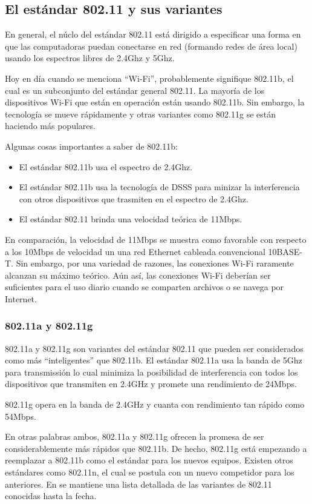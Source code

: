 \documentclass[10pt,journal,compsoc]{IEEEtran}
\begin{document}
\subsection{El estándar 802.11 y sus variantes}
En general, el núclo del estándar 802.11 está dirigido a especificar una forma en que las computadoras puedan conectarse en red (formando redes de área local) usando los espectros libres de 2.4Ghz y 5Ghz. 

Hoy en día cuando se menciona ``Wi-Fi'', probablemente signifique 802.11b, el cual es un subconjunto del estándar general 802.11. La mayoría de los dispositivos Wi-Fi que están en operación están usando 802.11b. Sin embargo, la tecnología se mueve rápidamente y otras variantes como 802.11g se están haciendo más populares.

Algunas cosas importantes a saber de 802.11b:
\begin{itemize}
    \item El estándar 802.11b usa el espectro de 2.4Ghz.
    \item El estándar 802.11b usa la tecnología de DSSS para minizar la interferencia con otros dispositivos que trasmiten en el espectro de 2.4Ghz.
    \item El estándar 802.11 brinda una velocidad teórica de 11Mbps.
\end{itemize}

En comparación, la velocidad de 11Mbps se muestra como favorable con respecto a los 10Mbps de velocidad un una red Ethernet cableada convencional \textsc{10BASE-T}. Sin embargo, por una variedad de razones, las conexiones Wi-Fi raramente alcanzan su máximo teórico. Aún así, las conexiones Wi-Fi deberían ser suficientes para el uso diario cuando se comparten archivos o se navega por Internet. 

\subsubsection{802.11a y 802.11g}
802.11a y 802.11g son variantes del estándar 802.11 que pueden ser considerados como más ``inteligentes'' que 802.11b. El estándar 802.11a usa la banda de 5Ghz para transmissión lo cual minimiza la posibilidad de interferencia con todos los dispositivos que transmiten en 2.4GHz y promete una rendimiento de 24Mbps. 

802.11g opera en la banda de 2.4GHz y cuanta con rendimiento tan rápido como 54Mbps.

En otras palabras ambos, 802.11a y 802.11g ofrecen la promesa de ser considerablemente más rápidos que 802.11b. De hecho, 802.11g está empezando a reemplazar a 802.11b como el estándar para los nuevos equipos. Existen otros estándares como 802.11n, el cual se postula con un nuevo competidor para los anteriores. En \cite{wikipedia-80211} se mantiene una lista detallada de las variantes de 802.11 conocidas hasta la fecha. 
\end{document}
